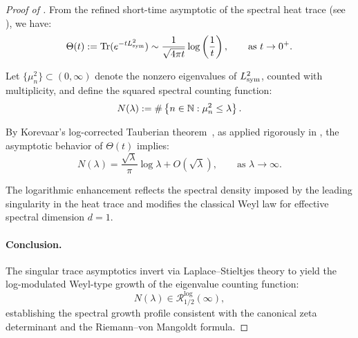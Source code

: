 \begin{proof}[Proof of ]
From the refined short-time asymptotic of the spectral heat trace (see ), we have:
\[
\Theta(t) := \operatorname{Tr}(e^{-t L_{\mathrm{sym}}^2}) \sim \frac{1}{\sqrt{4\pi t}} \log\left( \frac{1}{t} \right), \qquad \text{as } t \to 0^+.
\]

Let \( \{ \mu_n^2 \} \subset (0, \infty) \) denote the nonzero eigenvalues of \( L_{\mathrm{sym}}^2 \), counted with multiplicity, and define the squared spectral counting function:
\[
N(\lambda) := \#\left\{ n \in \mathbb{N} : \mu_n^2 \le \lambda \right\}.
\]

By Korevaar’s log-corrected Tauberian theorem~\cite[Ch.~III, §5]{Korevaar2004Tauberian}, as applied rigorously in , the asymptotic behavior of \( \Theta(t) \) implies:
\[
N(\lambda) = \frac{\sqrt{\lambda}}{\pi} \log \lambda + O(\sqrt{\lambda}), \qquad \text{as } \lambda \to \infty.
\]

The logarithmic enhancement reflects the spectral density imposed by the leading singularity in the heat trace and modifies the classical Weyl law for effective spectral dimension \( d = 1 \).

\paragraph{Conclusion.}
The singular trace asymptotics invert via Laplace–Stieltjes theory to yield the log-modulated Weyl-type growth of the eigenvalue counting function:
\[
N(\lambda) \in \mathcal{R}_{1/2}^{\log}(\infty),
\]
establishing the spectral growth profile consistent with the canonical zeta determinant and the Riemann–von Mangoldt formula.
\end{proof}
